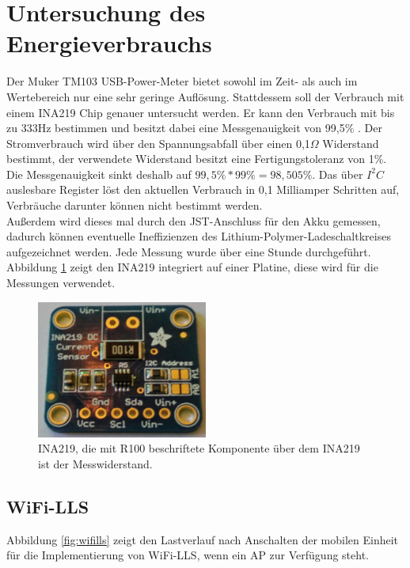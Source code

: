 \section{Untersuchung des Energieverbrauchs}
\label{ch:phase1:sec:energie}
Der Muker TM103 USB-Power-Meter bietet sowohl im Zeit- als auch im Wertebereich nur eine sehr geringe Auflösung.
Stattdessem soll der Verbrauch mit einem INA219 Chip genauer untersucht werden.
Er kann den Verbrauch mit bis zu 333Hz bestimmen und besitzt dabei eine Messgenauigkeit von 99,5\% \cite{texas2015ina}.
Der Stromverbrauch wird über den Spannungsabfall über einen 0,1$\Omega$ Widerstand bestimmt, der verwendete Widerstand besitzt eine Fertigungstoleranz von 1\%.
Die Messgenauigkeit sinkt deshalb auf $99,5\% * 99\% = 98,505\%$. 
Das über $I^2C$ auslesbare Register löst den aktuellen Verbrauch in 0,1 Milliamper Schritten auf, Verbräuche darunter können nicht bestimmt werden.\\
Außerdem wird dieses mal durch den JST-Anschluss für den Akku gemessen, dadurch können eventuelle Ineffizienzen des Lithium-Polymer-Ladeschaltkreises aufgezeichnet werden. 
Jede Messung wurde über eine Stunde durchgeführt.
Abbildung \ref{fig:ina219} zeigt den INA219 integriert auf einer Platine, diese wird für die Messungen verwendet.

\begin{figure}[h!]
  \centering
	\includegraphics[width=0.5\textwidth]{images/ina219.jpg}
  \caption{INA219, die mit R100 beschriftete Komponente über dem INA219 ist der Messwiderstand.}
  \label{fig:ina219}
\end{figure}

\subsection{WiFi-LLS}
\label{ch:phase1:sec:powerwifills}
Abbildung \ref{fig:wifills} zeigt den Lastverlauf nach Anschalten der mobilen Einheit für die Implementierung von WiFi-LLS, wenn ein AP zur Verfügung steht. 

